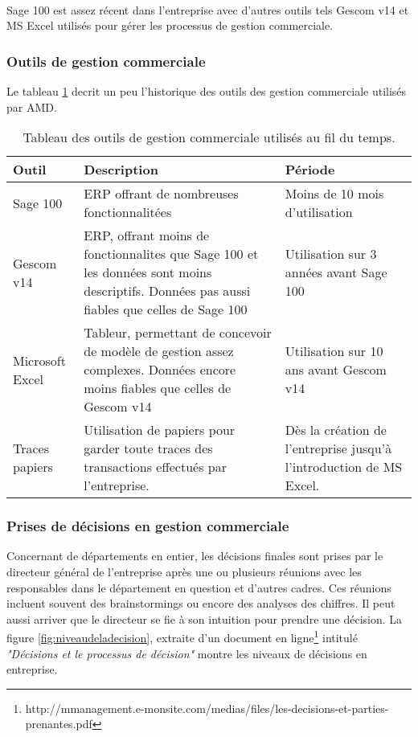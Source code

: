 \paragraph{}
Sage 100 est assez récent dans l’entreprise avec d’autres outils tels Gescom v14 et MS Excel utilisés pour gérer les processus de gestion commerciale. 

\subsubsection{Outils de gestion commerciale}
Le tableau \ref{tab:outilsdegescom} decrit un peu l'historique des outils des gestion commerciale utilisés par AMD.

\begin{table}[H]
    \centering
    \caption{Tableau des outils de gestion commerciale utilisés au fil du temps.}
    \begin{tabular}[t]{|p{3cm}|p{7cm}|p{5cm}|} 
        \hline
        \textbf{Outil} & \textbf{Description} & \textbf{Période} \\
        \hline\hline
        Sage 100 & ERP offrant de nombreuses fonctionnalitées & Moins de 10 mois d'utilisation \\
        \hline
        Gescom v14 & ERP, offrant moins de fonctionnalites que Sage 100 et les données sont moins descriptifs. Données pas aussi  fiables que celles de Sage 100  & Utilisation sur 3 années avant Sage 100 \\ 
        \hline
        Microsoft Excel & Tableur, permettant de concevoir de modèle de gestion assez complexes. Données encore moins fiables que celles de Gescom v14 & Utilisation sur 10 ans avant Gescom v14 \\ 
        \hline
        Traces papiers & Utilisation de papiers pour garder toute traces des transactions effectués par l’entreprise. & Dès la création de l’entreprise jusqu’à l’introduction de MS Excel. \\ 
        \hline\hline
    \end{tabular}
    \label{tab:outilsdegescom}
\end{table}%

\subsubsection{Prises de décisions en gestion commerciale}
Concernant de départements en entier, les décisions finales sont prises par le directeur général de l’entreprise après une ou plusieurs réunions avec les responsables dans le département en question et d’autres cadres. Ces réunions incluent souvent des brainstormings ou encore des analyses des chiffres. Il peut aussi arriver que le directeur se fie à son intuition pour prendre une décision. La figure \ref{fig:niveaudeladecision}, extraite d'un document en ligne\footnote{http://mmanagement.e-monsite.com/medias/files/les-decisions-et-parties-prenantes.pdf} intitulé \textit{"Décisions et le processus de décision"} montre les niveaux de décisions en entreprise.

